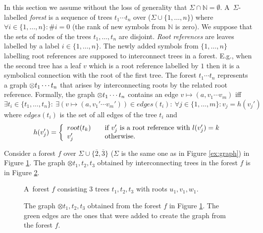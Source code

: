 \documentclass[a4paper, 12pt]{article}
\begin{document}
In this section we assume without the loss of generality that $\Sigma \cap \mathbb{N} = \emptyset$.
A~$\Sigma$-labelled \emph{forest} is a sequence of trees $t_1 \cdots t_n$ over ($\Sigma \cup \{1,\ldots,n\}$)
where $\forall i \in \{1,\ldots,n\}: \#i = 0$ (the rank of new symbols from $\mathbb{N}$ is zero).
We suppose that the sets of nodes of the trees $t_1, \ldots, t_n$ are disjoint.
\emph{Root references} are leaves labelled by a label $i \in \{1,\ldots,n\}$.
The newly added symbols from $\{1,\ldots,n\}$ labelling root references are
supposed to interconnect trees in a forest.
E.g., when the second tree has a leaf $v$ which is a root reference labelled by $1$
then it is a symbolical connection with the root of the first tree.
The forest $t_1 \cdots t_n$ represents a graph $\otimes t_1 \cdots t_n$ that arises
by interconnecting roots by the related root reference.
Formally, the graph $\otimes t_1 \cdots t_n$ contains an edge $v \mapsto (a,v_1 \cdots v_m)$ iff $\exists t_i \in \{t_1, \ldots, t_n\}:\ \exists(v \mapsto (a, v_1' \cdots v_m')) \in edges(t_i):
\ \forall j \in \{1,\ldots,m\}: v_j = h(v_j')$ where $edges(t_i)$ is the set of all edges of the tree $t_i$ and
\[ h(v_j') = \left\{
  \begin{array}{l l}
  root(t_k) & \quad \text{if $v_j'$ is a root reference with $l(v_j') = k$}\\
  v_j'   & \quad \text{otherwise.}
  \end{array} \right.\]

Consider a forest $f$ over $\Sigma \cup \{\overline{2}, \overline{3}\}$
($\Sigma$ is the same one as in Figure \ref{ex:graph}) in Figure \ref{fig:forest}.
The graph $\otimes t_1,t_2,t_3$ obtained by interconnecting trees in the forest $f$ is in Figure \ref{fig:forest_graph}.

	\begin{figure}[bth]
	\begin{center}
		\scalebox{1}
		{
			
			\hspace{0.55cm}
			
			\hspace{0.55cm}
			
		}
		\caption{A~forest $f$ consisting 3 trees $t_1, t_2, t_3$ with roots $u_1, v_1, w_1$.}
	  \label{fig:forest}
	\end{center}
	\end{figure}

	\begin{figure}[bth]
	\begin{center}
		
		\caption{The graph $\otimes t_1,t_2,t_3$ obtained from the forest $f$ in Figure \ref{fig:forest}.
		The green edges are the ones that were added to create the graph from the forest $f$.}
	  \label{fig:forest_graph}
	\end{center}
	\end{figure}
\end{document}
